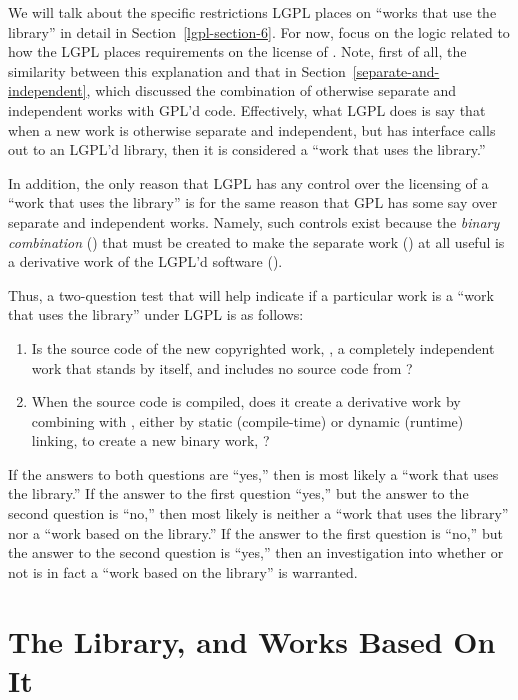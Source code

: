 We will talk about the specific restrictions LGPL places on ``works
that use the library'' in detail in Section~\ref{lgpl-section-6}. For
now, focus on the logic related to how the LGPL places requirements on
the license of \lplusi{}. Note, first of all, the similarity between
this explanation and that in Section~\ref{separate-and-independent},
which discussed the combination of otherwise separate and independent
works with GPL'd code. Effectively, what LGPL does is say that when a
new work is otherwise separate and independent, but has interface
calls out to an LGPL'd library, then it is considered a ``work that
uses the library.''

In addition, the only reason that LGPL has any control over the licensing
of a ``work that uses the library'' is for the same reason that GPL has
some say over separate and independent works. Namely, such controls exist
because the {\em binary combination\/} (\lplusi{}) that must be created to
make the separate work (\worki{}) at all useful is a derivative work of
the LGPL'd software (\workl{}).

Thus, a two-question test that will help indicate if a particular work is
a ``work that uses the library'' under LGPL is as follows:

\begin{enumerate}

\item Is the source code of the new copyrighted work, \worki{}, a
  completely independent work that stands by itself, and includes no
  source code from \workl{}?

\item When the source code is compiled, does it create a derivative work
  by combining with \workl{}, either by static (compile-time) or dynamic
  (runtime) linking, to create a new binary work, \lplusi{}?
\end{enumerate}

If the answers to both questions are ``yes,'' then \worki{} is most likely
a ``work that uses the library.''  If the answer to the first question
``yes,'' but the answer to the second question is ``no,'' then most likely
\worki{} is neither a ``work that uses the library'' nor a ``work based on
the library.''  If the answer to the first question is ``no,'' but the
answer to the second question is ``yes,'' then an investigation into
whether or not \worki{} is in fact a ``work based on the library'' is
warranted.

\section{The Library, and Works Based On It}

